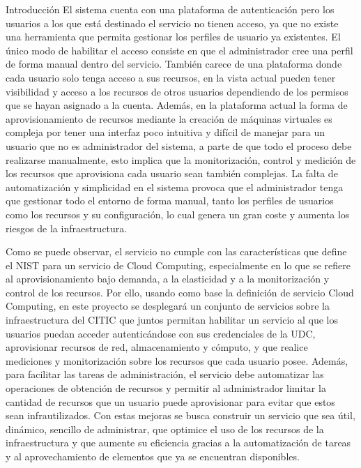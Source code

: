 \begin{chapter}{Introducción}
El sistema cuenta con una plataforma de autenticación pero los usuarios a los que está destinado el servicio no tienen acceso, ya que no existe una herramienta que permita gestionar los perfiles de usuario ya existentes. El único modo de habilitar el acceso consiste en que el administrador cree una perfil de forma manual dentro del servicio. También carece de una plataforma donde cada usuario solo tenga acceso a sus recursos, en la vista actual pueden tener visibilidad y acceso a los recursos de otros usuarios dependiendo de los permisos que se hayan asignado a la cuenta. Además, en la plataforma actual la forma de aprovisionamiento de recursos mediante la creación de máquinas virtuales es compleja  por tener una interfaz poco intuitiva y difícil de manejar para un usuario que no es administrador del sistema, a parte de que todo el proceso debe realizarse manualmente, esto implica que la monitorización, control y medición de los recursos que aprovisiona cada usuario sean también complejas. La falta de automatización y simplicidad en el sistema provoca que el administrador tenga que gestionar todo el entorno de forma manual, tanto los perfiles de usuarios como los recursos y su configuración, lo cual genera un gran coste y aumenta los riesgos de la infraestructura.

Como se puede observar, el servicio no cumple con las características que define el NIST para un servicio de Cloud Computing, especialmente en lo que se refiere al aprovisionamiento bajo demanda, a la elasticidad y a la monitorización y control de los recursos. Por ello, usando como base la definición de servicio Cloud Computing, en este proyecto se desplegará un conjunto de servicios sobre la infraestructura del CITIC que juntos permitan habilitar un servicio al que los usuarios puedan acceder autenticándose con sus credenciales de la UDC, aprovisionar recursos de red, almacenamiento y cómputo, y que realice mediciones y monitorización sobre los recursos que cada usuario posee. Además, para facilitar las tareas de administración, el servicio debe automatizar las operaciones de obtención de recursos y permitir al administrador limitar la cantidad de recursos que un usuario puede aprovisionar para evitar que estos sean infrautilizados.
Con estas mejoras se busca construir un servicio que sea útil, dinámico, sencillo de administrar, que optimice el uso de los recursos de la infraestructura y que aumente su eficiencia gracias a la automatización de tareas y al aprovechamiento de elementos que ya se encuentran disponibles.


\end{chapter}
